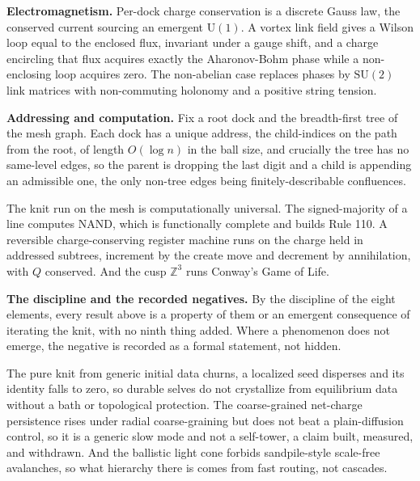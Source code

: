 \textbf{Electromagnetism.} Per-dock charge conservation is a discrete Gauss law, the conserved current sourcing an emergent $\mathrm{U}(1)$. A vortex link field gives a Wilson loop equal to the enclosed flux, invariant under a gauge shift, and a charge encircling that flux acquires exactly the Aharonov-Bohm phase while a non-enclosing loop acquires zero. The non-abelian case replaces phases by $\mathrm{SU}(2)$ link matrices with non-commuting holonomy and a positive string tension.

\textbf{Addressing and computation.} Fix a root dock and the breadth-first tree of the mesh graph. Each dock has a unique address, the child-indices on the path from the root, of length $O(\log n)$ in the ball size, and crucially the tree has no same-level edges, so the parent is dropping the last digit and a child is appending an admissible one, the only non-tree edges being finitely-describable confluences.

\begin{result}[Universality]
The knit run on the mesh is computationally universal. The signed-majority of a line computes $\mathrm{NAND}$, which is functionally complete and builds Rule 110. A reversible charge-conserving register machine runs on the charge held in addressed subtrees, increment by the create move and decrement by annihilation, with $Q$ conserved. And the cusp $\mathbb{Z}^3$ runs Conway's Game of Life. \cite{pollard2026vibetest}
\end{result}

\textbf{The discipline and the recorded negatives.} By the discipline of the eight elements, every result above is a property of them or an emergent consequence of iterating the knit, with no ninth thing added. Where a phenomenon does not emerge, the negative is recorded as a formal statement, not hidden.

\begin{result}
The pure knit from generic initial data churns, a localized seed disperses and its identity falls to zero, so durable selves do not crystallize from equilibrium data without a bath or topological protection. The coarse-grained net-charge persistence rises under radial coarse-graining but does not beat a plain-diffusion control, so it is a generic slow mode and not a self-tower, a claim built, measured, and withdrawn. And the ballistic light cone forbids sandpile-style scale-free avalanches, so what hierarchy there is comes from fast routing, not cascades. \cite{pollard2026vibetest}
\end{result}

